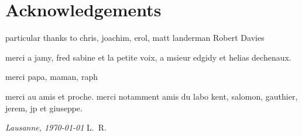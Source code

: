 \chapter*{Acknowledgements}


particular thanks to chris, joachim, erol, matt landerman Robert Davies

merci a jamy, fred sabine et la petite voix, a msieur edgidy et helias dechenaux.

merci papa, maman, raph

merci au amis et proche. merci notamment amis du labo kent, salomon, gauthier, jerem, jp et giuseppe.

\bigskip
 
\noindent\textit{Lausanne, \today}
\hfill L.~R.
